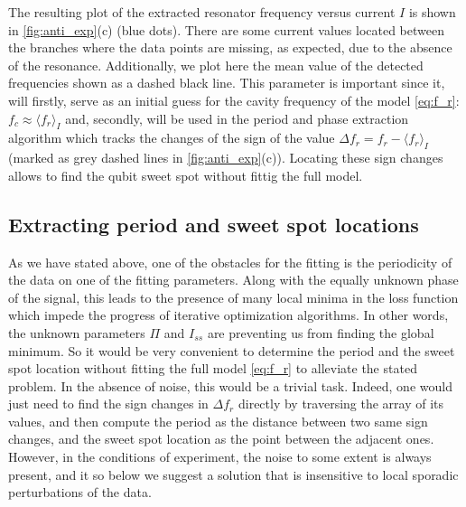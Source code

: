 \documentclass[%
 aip,
 draft,
 amsmath,amssymb,
 reprint,%
]{revtex4-1}
\begin{document}
The resulting plot of the extracted resonator frequency versus current $I$ is shown in \autoref{fig:anti_exp}(c) (blue dots). There are some current values located between the branches where the data points are missing, as expected, due to the absence of the resonance. Additionally, we plot here the mean value of the detected frequencies shown as a dashed black line. This parameter is important since it, will firstly, serve as an initial guess for the cavity frequency of the model \eqref{eq:f_r}: $f_c \approx \langle f_r \rangle_{I}$ and, secondly, will be used in the period and phase extraction algorithm which tracks the changes of the sign of the value $\Delta f_r = f_r - \langle f_r \rangle_{I}$ (marked as grey dashed lines in \autoref{fig:anti_exp}(c)). Locating these sign changes allows to find the qubit sweet spot without fittig the full model.

\subsection{Extracting period and sweet spot locations}

As we have stated above, one of the obstacles for the fitting is the periodicity of the data on one of the fitting parameters. Along with the equally unknown phase of the signal, this leads to the presence of many local minima in the loss function which impede the progress of iterative optimization algorithms. In other words, the unknown parameters $\Pi$ and $I_{ss}$ are preventing us from finding the global minimum. So it would be very convenient to determine the period and the sweet spot location without fitting the full model \eqref{eq:f_r} to alleviate the stated problem. In the absence of noise, this would be a trivial task. Indeed, one would just need to find the sign changes in $ \Delta f_r $ directly by traversing the array of its values, and then compute the period as the distance between two same sign changes, and the sweet spot location as the point between the adjacent ones. However, in the conditions of experiment, the noise to some extent is always present, and it  so below we suggest a solution that is insensitive to local sporadic perturbations of the data.
\end{document}
